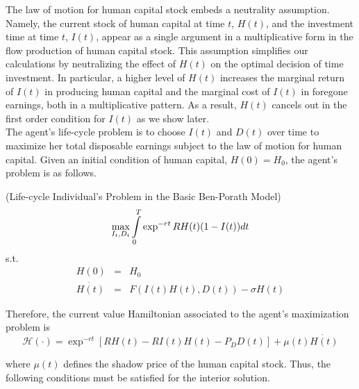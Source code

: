 \indent The law of motion for human capital stock embeds a neutrality assumption. Namely, the current stock of human capital at time $t$, $H(t)$, and the investment time at time $t$, $I(t)$, appear as a single argument in a multiplicative form in the flow production of human capital stock. This assumption simplifies our calculations by neutralizing the effect of $H(t)$ on the optimal decision of time investment. In particular, a higher level of $H(t)$ increases the marginal return of $I(t)$ in producing human capital and the marginal cost of $I(t)$ in foregone earnings, both in a multiplicative pattern. As a result, $H(t)$ cancels out in the first order condition for $I(t)$ as we show later.\\
\indent The agent's life-cycle problem is to choose $I(t)$ and $D(t)$ over time to maximize her total disposable earnings subject to the law of motion for human capital. Given an initial condition of human capital, $H(0)=H_0$, the agent's problem is as follows.

\begin{problem} \label{problem:bbp} (Life-cycle Individual's Problem in the Basic Ben-Porath Model)
\begin{equation}
\max_{{I_{t}, D_{t}}} \int \limits _{0} ^{T} \exp^{-rt} RH(t)(1 - I(t)) dt \nonumber \\
\end{equation}
\noindent s.t.
\begin{eqnarray}
H(0) &=& H_{0} \nonumber \\
\dot{H(t)} &=& F \left( I(t) H(t), D(t) \right) - \sigma H(t) \nonumber
\end{eqnarray}
\end{problem}

\indent Therefore, the current value Hamiltonian associated to the agent's maximization problem is
\begin{equation}
\mathcal{H} (\cdot) = \exp^{-rt} \left[ R H(t) -  R I(t) H(t) - P_{D} D(t) \right] + \mu(t) \dot{H(t)} 
\end{equation}

\noindent where $\mu(t)$ defines the shadow price of the human capital stock. Thus, the following conditions must be satisfied for the interior solution.

